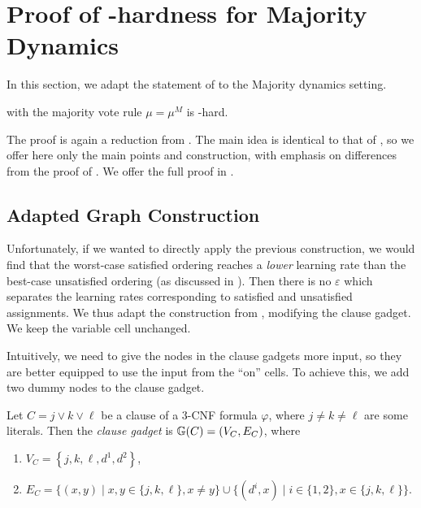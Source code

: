 \section{Proof of \np-hardness for Majority Dynamics}
\label{sec:maj}


In this section, we adapt the statement of  to the Majority dynamics setting.

\begin{theorem}[ ]\label{thm:nphardness_maj}
	\netlearn{} with the majority vote rule $\mu = \mu^M$ is \np-hard.
\end{theorem}

The proof is again a reduction from \sat.
The main idea is identical to that of , so we offer here only the main points and construction, with emphasis on differences from the proof of .
We offer the full proof in \appmaj.

\subsection{Adapted Graph Construction}
\label{ssec:maj_graph}

Unfortunately, if we wanted to directly apply the previous construction, we would find that the worst-case satisfied ordering reaches a \emph{lower} learning rate than the best-case unsatisfied ordering (as discussed in ).
Then there is no $ \varepsilon $ which separates the learning rates corresponding to satisfied and unsatisfied assignments.
We thus adapt the construction from , modifying the clause gadget.
We keep the variable cell unchanged.

\variableCell*

Intuitively, we need to give the nodes in the clause gadgets more input, so they are better equipped to use the input from the ``on'' cells.
To achieve this, we add two dummy nodes to the clause gadget.

\begin{definition}
    Let $ C = j \lor k \lor \ell $ be a clause of a 3-CNF formula $ \varphi $, where $ j \neq k \neq \ell $ are some literals.
    Then the \emph{clause gadget} is $ \mathbb{G}\!\left(C\right) = \left( V_C, E_C \right) $, where \begin{enumerate}[ ]
    	\item $ V_C = \left\{ j,k,\ell, d^1, d^2 \right\} $,
    	\item $ E_C = \{ ( x,y ) \mid x,y \in \{ j,k,\ell \}, x \neq y \} \cup \{ ( d^i, x ) \mid i \in \{ 1,2 \} , x \in \{ j,k,\ell \} \} $.
    \end{enumerate}
\end{definition}

